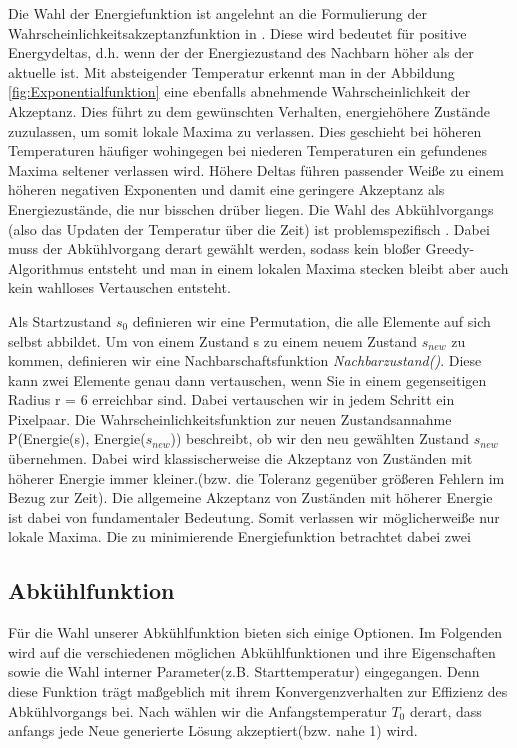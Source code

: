 Die Wahl der Energiefunktion ist angelehnt an die Formulierung der 
Wahrscheinlichkeitsakzeptanzfunktion in \cite{Kirkpatrick671}. 
Diese wird bedeutet für positive Energydeltas, d.h. wenn der der Energiezustand
des Nachbarn höher als der aktuelle ist. Mit absteigender Temperatur erkennt man 
in der Abbildung \ref{fig:Exponentialfunktion} eine ebenfalls abnehmende Wahrscheinlichkeit
der Akzeptanz. Dies führt zu dem gewünschten Verhalten, energiehöhere Zustände 
zuzulassen, um somit lokale Maxima zu verlassen. Dies geschieht bei höheren 
Temperaturen häufiger wohingegen bei niederen Temperaturen ein gefundenes Maxima
seltener verlassen wird. Höhere Deltas führen passender Weiße zu einem höheren negativen 
Exponenten und damit eine geringere Akzeptanz als Energiezustände, die nur bisschen 
drüber liegen. Die Wahl des Abkühlvorgangs (also das Updaten der Temperatur über die Zeit)
ist problemspezifisch \cite[S. 9]{Kirkpatrick671}. Dabei muss der Abkühlvorgang derart
gewählt werden, sodass kein bloßer Greedy-Algorithmus entsteht und man in einem lokalen 
Maxima stecken bleibt aber auch kein wahlloses Vertauschen entsteht.

Als Startzustand $s_{0}$ definieren wir eine Permutation, die alle 
Elemente auf sich selbst abbildet.
Um von einem Zustand s zu einem neuem Zustand $s_{new}$ zu kommen,
definieren wir eine Nachbarschaftsfunktion \textit{Nachbarzustand()}. 
Diese kann zwei Elemente genau dann vertauschen, wenn Sie in einem 
gegenseitigen Radius r = 6 erreichbar sind. Dabei vertauschen wir
in jedem Schritt ein Pixelpaar. 
Die Wahrscheinlichkeitsfunktion zur neuen Zustandsannahme
P(Energie(s), Energie($s_{new}$)) beschreibt, ob wir den neu
gewählten Zustand $s_{new}$ übernehmen. Dabei wird klassischerweise die
Akzeptanz von Zuständen mit höherer Energie immer kleiner.(bzw. die 
Toleranz gegenüber größeren Fehlern im Bezug zur Zeit). Die allgemeine Akzeptanz von 
Zuständen mit höherer Energie ist dabei von fundamentaler Bedeutung.
Somit verlassen wir möglicherweiße nur lokale Maxima.
Die zu minimierende Energiefunktion  betrachtet
dabei zwei 

\subsection{Abkühlfunktion}
Für die Wahl unserer Abkühlfunktion bieten sich einige Optionen.\cite{coolDownOverview}
Im Folgenden wird auf die verschiedenen möglichen Abkühlfunktionen und ihre Eigenschaften
sowie die Wahl interner Parameter(z.B. Starttemperatur) eingegangen. Denn diese Funktion
trägt maßgeblich mit ihrem Konvergenzverhalten zur Effizienz des Abkühlvorgangs bei.
Nach \cite{Kirkpatrick671} wählen wir die Anfangstemperatur $T_0$ derart, dass anfangs jede Neue generierte Lösung akzeptiert(bzw. nahe 1) wird.

